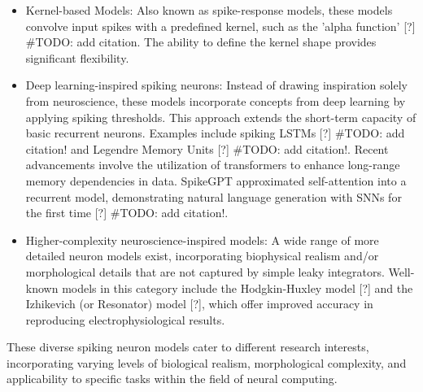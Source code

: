 \begin{itemize}
    \item Kernel-based Models: Also known as spike-response models, these models convolve input spikes with a predefined kernel, such as the 'alpha function' [?] #TODO: add citation. The ability to define the kernel shape provides significant flexibility.

    \item Deep learning-inspired spiking neurons: Instead of drawing inspiration solely from neuroscience, these models incorporate concepts from deep learning by applying spiking thresholds. This approach extends the short-term capacity of basic recurrent neurons. Examples include spiking LSTMs [?] #TODO: add citation! and Legendre Memory Units [?] #TODO: add citation!. Recent advancements involve the utilization of transformers to enhance long-range memory dependencies in data. SpikeGPT approximated self-attention into a recurrent model, demonstrating natural language generation with SNNs for the first time [?] #TODO: add citation!.

    \item Higher-complexity neuroscience-inspired models: A wide range of more detailed neuron models exist, incorporating biophysical realism and/or morphological details that are not captured by simple leaky integrators. Well-known models in this category include the Hodgkin-Huxley model [?] and the Izhikevich (or Resonator) model [?], which offer improved accuracy in reproducing electrophysiological results.
    
\end{itemize}

These diverse spiking neuron models cater to different research interests, incorporating varying levels of biological realism, morphological complexity, and applicability to specific tasks within the field of neural computing.
